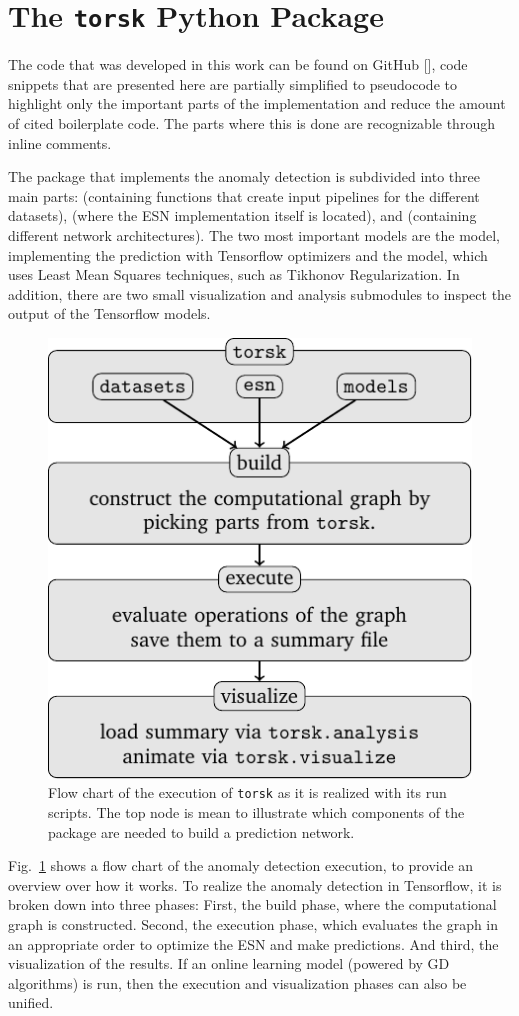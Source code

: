 \section{The \texttt{torsk} Python Package}%
\label{sec:torsk}

The code that was developed in this work can be found on GitHub
[\cite{coderepo}], code snippets that are presented here are partially simplified
to pseudocode to highlight only the important parts of the implementation and
reduce the amount of cited boilerplate code. The parts where this is done are
recognizable through inline comments.

The package that implements the anomaly detection is subdivided into three main
parts:  (containing functions that create input pipelines
for the different datasets),  (where the ESN implementation
itself is located), and  (containing different network
architectures). The two most important models are the  model,
implementing the prediction with Tensorflow optimizers and the  model,
which uses Least Mean Squares techniques, such as Tikhonov Regularization.  In
addition, there are two small visualization and analysis submodules to inspect
the output of the Tensorflow models.

\begin{figure}
  \centering
  \includegraphics[width=0.5\linewidth]{tikz/flow.pdf}
  \caption{Flow chart of the execution of \texttt{torsk} as it is realized with
  its run scripts. The top node is mean to illustrate which components of the
  package are needed to build a prediction network.}
  \label{fig:flowchart}
\end{figure}

Fig.~\ref{fig:flowchart} shows a flow chart of the anomaly detection
execution, to provide an overview over how it works.  To realize the
anomaly detection in Tensorflow, it is broken down into three phases: First,
the build phase, where the computational graph is constructed. Second, the
execution phase, which evaluates the graph in an appropriate order to optimize
the ESN and make predictions. And third, the visualization of the results.  If
an online learning model (powered by GD algorithms) is run, then the execution
and visualization phases can also be unified.

